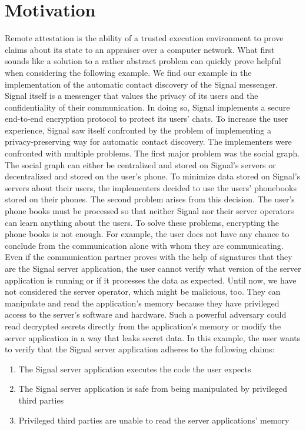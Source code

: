 \section{Motivation}
\label{sec:10:motivation}
Remote attestation is the ability of a trusted execution environment to prove claims about its state to an appraiser
over a computer network. \cite{coker_principles_2011} What first sounds like a solution to a rather abstract problem can
quickly prove helpful when considering the following example.
We find our example in the implementation of the automatic contact discovery of the Signal messenger. Signal itself is a
messenger that values the privacy of its users and the confidentiality of their communication. In doing so, Signal
implements a secure end-to-end encryption protocol to protect its users' chats.\cite{cohn2020formal}
To increase the user experience, Signal saw itself confronted by the problem of implementing a privacy-preserving way
for automatic contact discovery.\cite{SignalCd} The implementers were confronted with multiple problems. The first major
problem was the social graph. The social graph can either be centralized and stored on Signal's servers or decentralized
and stored on the user's phone. To minimize data stored on Signal's servers about their users, the implementers decided
to use the users' phonebooks stored on their phones.
The second problem arises from this decision. The user's phone books must be processed so
that neither Signal nor their server operators can learn anything about the users.
To solve these problems, encrypting the phone books is not enough. For example, the user does not have any chance to
conclude from the communication alone with whom they are communicating. Even if the communication partner proves with
the help of signatures that they are the Signal server application, the user cannot verify what version of the server
application is running or if it processes the data as expected. Until now, we have not considered the server operator,
which might be malicious, too. They can manipulate and read the application's memory because they have privileged access
to the server's software and hardware. Such a powerful adversary could read decrypted secrets directly from the application's
memory or modify the server application in a way that leaks secret data.
In this example, the user wants to verify that the Signal server application adheres to the following claims:
\begin{enumerate}
    \item The Signal server application executes the code the user expects
    \item The Signal server application is safe from being manipulated by privileged third parties
    \item Privileged third parties are unable to read the server applications' memory
\end{enumerate}
